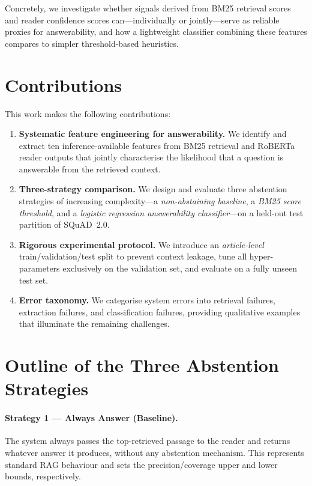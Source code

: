 Concretely, we investigate whether signals derived from BM25 retrieval scores
and reader confidence scores can—individually or jointly—serve as reliable
proxies for answerability, and how a lightweight classifier combining these
features compares to simpler threshold-based heuristics.

\section{Contributions}
\label{sec:intro_contributions}

This work makes the following contributions:

\begin{enumerate}
  \item \textbf{Systematic feature engineering for answerability.}  We identify
        and extract ten inference-available features from BM25 retrieval and RoBERTa
        reader outputs that jointly characterise the likelihood that a question
        is answerable from the retrieved context.

  \item \textbf{Three-strategy comparison.}  We design and evaluate three
        abstention strategies of increasing complexity—a \emph{non-abstaining
        baseline}, a \emph{BM25 score threshold}, and a \emph{logistic
        regression answerability classifier}—on a held-out test partition of
        SQuAD~2.0.

  \item \textbf{Rigorous experimental protocol.}  We introduce an
        \emph{article-level} train/validation/test split to prevent context
        leakage, tune all hyper-parameters exclusively on the validation set,
        and evaluate on a fully unseen test set.

  \item \textbf{Error taxonomy.}  We categorise system errors into retrieval
        failures, extraction failures, and classification failures, providing
        qualitative examples that illuminate the remaining challenges.
\end{enumerate}

\section{Outline of the Three Abstention Strategies}
\label{sec:intro_strategies}

\paragraph{Strategy 1 — Always Answer (Baseline).}
The system always passes the top-retrieved passage to the reader and returns
whatever answer it produces, without any abstention mechanism. This represents
standard RAG behaviour and sets the precision/coverage upper and lower bounds,
respectively.

